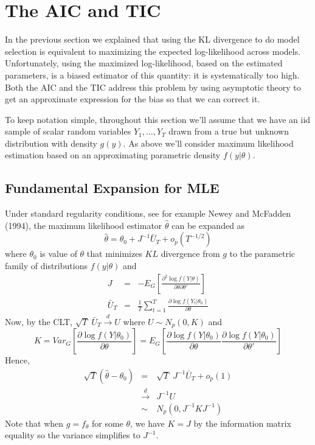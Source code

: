 \documentclass[12pt]{article}
\theoremstyle{definition}
\begin{document}
\section{The AIC and TIC}
In the previous section we explained that using the KL divergence to do model selection is equivalent to maximizing the expected log-likelihood across models. Unfortunately, using the maximized log-likelihood, based on the estimated parameters, is a biased estimator of this quantity: it is systematically too high. Both the AIC and the TIC address this problem by using asymptotic theory to get an approximate expression for the bias so that we can correct it.

To keep notation simple, throughout this section we'll assume that we have an iid sample of scalar random variables $Y_1, \hdots, Y_T$ drawn from a true but unknown distribution with density $g(y)$. As above we'll consider maximum likelihood estimation based on an approximating parametric density $f(y|\theta)$.

\subsection{Fundamental Expansion for MLE}
Under standard regularity conditions, see for example Newey and McFadden (1994), the maximum likelihood estimator $\widehat{\theta}$ can be expanded as
$$\widehat{\theta} = \theta_0 + J^{-1} \bar{U}_T + o_p(T^{-1/2})$$
where $\theta_0$ is value of $\theta$ that minimizes $KL$ divergence from $g$ to the parametric family of distributions $f(y|\theta)$ and
\begin{eqnarray*}
J &=& -E_G \left[ \frac{\partial^2 \log f(Y|\theta)}{\partial \theta \partial \theta'}\right]\\
\bar{U}_T &=& \frac{1}{T} \sum_{t=1}^T \frac{\partial \log f(Y_t|\theta_0)}{\partial\theta}
\end{eqnarray*}
Now, by the CLT, $\sqrt{T}\; \bar{U}_T \overset{d}{\rightarrow} U$ where $U\sim N_p(0, K)$ and
$$K = Var_G \left[ \frac{\partial \log f(Y|\theta_0)}{\partial\theta}\right] = E_G\left[ \frac{\partial \log f(Y|\theta_0)}{\partial\theta} \frac{\partial \log f(Y|\theta_0)}{\partial\theta'}\right]$$
Hence,
\begin{eqnarray*}
\sqrt{T}\left(\widehat{\theta} - \theta_0 \right) &=& \sqrt{T} \; J^{-1} \bar{U}_T + o_p(1) \\
&\overset{d}{\rightarrow}& J^{-1} U\\
&\sim& N_p(0, J^{-1}KJ^{-1})
\end{eqnarray*}
Note that when $g = f_\theta$ for some $\theta$, we have $K = J$ by the information matrix equality so the variance simplifies to $J^{-1}$.
\end{document}
